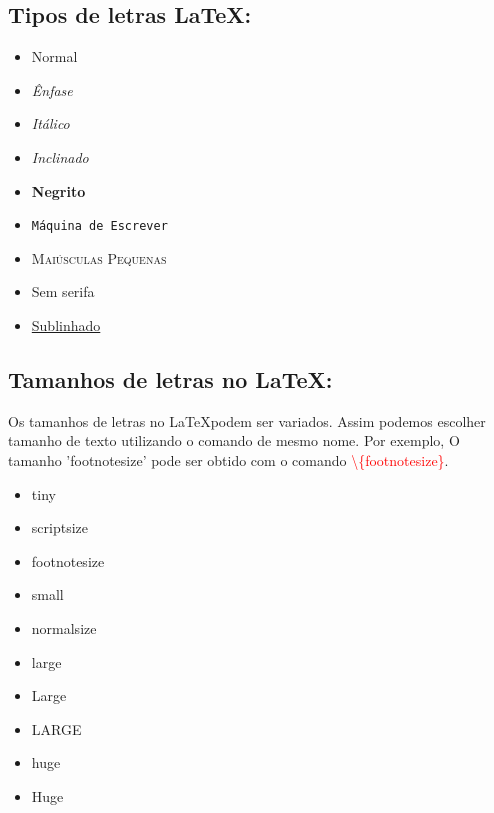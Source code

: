 \documentclass{article}
\begin{document}
\subsection{Tipos de letras \LaTeX:}

\begin{itemize}
	\item Normal
	\item \emph{Ênfase}
	\item \textit{Itálico}
	\item \textsl{Inclinado}
	\item \textbf{Negrito}
	\item \texttt{Máquina de Escrever}
	\item \textsc{Maiúsculas Pequenas}
	\item \textsf{Sem serifa}
	\item \underline{Sublinhado}
\end{itemize}



\subsection{Tamanhos de letras no \LaTeX:}
Os tamanhos de letras no \LaTeX podem ser variados. Assim podemos escolher tamanho de texto utilizando o comando de mesmo nome. Por exemplo, O tamanho 'footnotesize' pode ser obtido com o comando \textcolor{red}{\textbackslash \{footnotesize\}}.

\begin{itemize}
	\item {\tiny tiny}
	\item {\scriptsize scriptsize}
	\item {\footnotesize footnotesize}
	\item {\small small}
	\item {\normalsize normalsize}
	\item {\large large}
	\item {\Large Large}
	\item {\LARGE LARGE}
	\item {\huge huge}
	\item {\Huge Huge}
\end{itemize}
\end{document}
